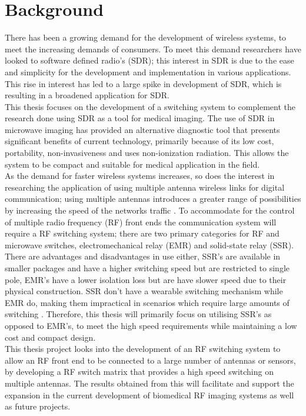 \documentclass[12pt,openany,a4paper]{book}
\begin{document}
\section{Background}
\justify
There has been a growing demand for the development of wireless systems, to meet the increasing demands of consumers. To meet this demand researchers have looked to software defined radio's (SDR); this interest in SDR is due to the ease and simplicity for the development and implementation in various applications. This rise in interest has led to a large spike in development of SDR, which is resulting in a broadened application for SDR. \cite{ref1} \\[0.2cm]
This thesis focuses on the development of a switching system to complement the research done using SDR as a tool for medical imaging. The use of SDR in microwave imaging has provided an alternative diagnostic tool that presents significant benefits of current technology, primarily because of its low cost, portability, non-invasiveness and uses non-ionization radiation. This allows the system to be compact and suitable for medical application in the field. \cite{ref2} \cite{ref3} \\[0.2cm]
As the demand for faster wireless systems increases, so does the interest in researching the application of using multiple antenna wireless links for digital communication; using multiple antennas introduces a greater range of possibilities by increasing the speed of the networks traffic \cite{ref4}. To accommodate for the control of multiple radio frequency (RF) front ends the communication system will require a RF switching system; there are two primary categories for RF and microwave switches, electromechanical relay (EMR) and solid-state relay (SSR). \\[0.2cm]
There are advantages and disadvantages in use either, SSR's are available in smaller packages and have a higher switching speed but are restricted to single pole, EMR's have a lower isolation loss but are have slower speed due to their physical construction. SSR don't have a wearable switching mechanism while EMR do, making them impractical in scenarios which require large amounts of switching \cite{ref5}. Therefore, this thesis will primarily focus on utilising SSR's as opposed to EMR's, to meet the high speed requirements while maintaining a low cost and compact design. \\[0.2cm]
This thesis project looks into the development of an RF switching system to allow an RF front end to be connected to a large number of antennas or sensors, by developing a RF switch matrix that provides a high speed switching on multiple antennas. The results obtained from this will facilitate and support the expansion in the current development of biomedical RF imaging systems as well as future projects.
\end{document}

